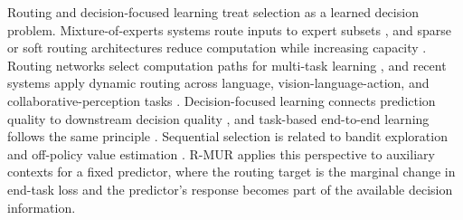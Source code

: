 Routing and decision-focused learning treat selection as a learned decision
problem. Mixture-of-experts systems route inputs to expert subsets
\citep{jacobs1991adaptive,shazeer2017outrageously,zhou2022mixture}, and sparse
or soft routing architectures reduce computation while increasing capacity
\citep{fedus2022switch,lewis2021base,roller2021hash,puigcerver2024sparse}.
Routing networks select computation paths for multi-task learning
\citep{rosenbaum2018routing,ma2018modeling}, and recent systems apply dynamic
routing across language, vision-language-action, and collaborative-perception
tasks \citep{failuremode2026routing,dream2026routing,cogmoe2026sparse}.
Decision-focused learning connects prediction quality to downstream decision
quality \citep{bertsimas2020predictive,elmachtoub2022smart,wilder2019melding,mandi2024decision},
and task-based end-to-end learning follows the same principle
\citep{donti2017task}. Sequential selection is related to bandit exploration
and off-policy value estimation \citep{auer2002finite,dudik2011doubly}. R-MUR
applies this perspective to auxiliary contexts for a fixed predictor, where the
routing target is the marginal change in end-task loss and the predictor's
response becomes part of the available decision information.
